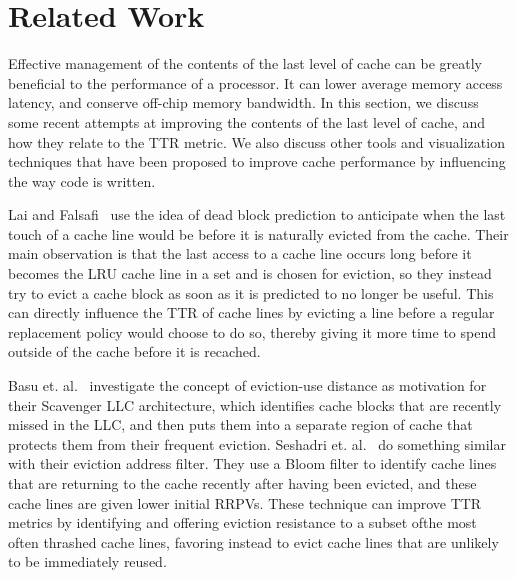 \section{Related Work}

Effective management of the contents of the last level of cache can
be greatly beneficial to the performance of a processor.  It can 
lower average memory access latency, and conserve off-chip memory 
bandwidth.  In this section, we discuss some recent attempts at improving
the contents of the last level of cache, and how they relate to the TTR 
metric.  We also discuss other tools
and visualization techniques that have been proposed to improve cache
performance by influencing the way code is written.


Lai and Falsafi~\cite{Lai00} use the idea of dead block prediction to 
anticipate when the last touch of a cache line would be before it is naturally
evicted from the cache.  Their main observation is that the last access to a cache
line occurs long before it becomes the LRU cache line in a set and is chosen
for eviction, so they instead try to evict a cache block as soon as it is predicted
to no longer be useful.  This can directly influence the TTR of cache lines by evicting a line before a 
regular replacement policy would choose to do so, thereby giving it more time to spend outside of the cache 
before it is recached.

Basu et. al.~\cite{basukirman07} investigate the concept of eviction-use distance
as motivation for their Scavenger LLC architecture, which identifies
cache blocks that are recently missed in the LLC, and then puts them
into a separate region of cache that protects them from their frequent
eviction.  
Seshadri et. al.~\cite{seshadri12} do something similar with their eviction address
filter.  They use a Bloom filter to identify cache lines that are returning to the
cache recently after having been evicted, and these cache lines are given lower
initial RRPVs.
These technique can improve TTR metrics by identifying and 
offering eviction resistance to a subset ofthe most
often thrashed cache lines, favoring instead to evict cache lines that are
unlikely to be immediately reused.

